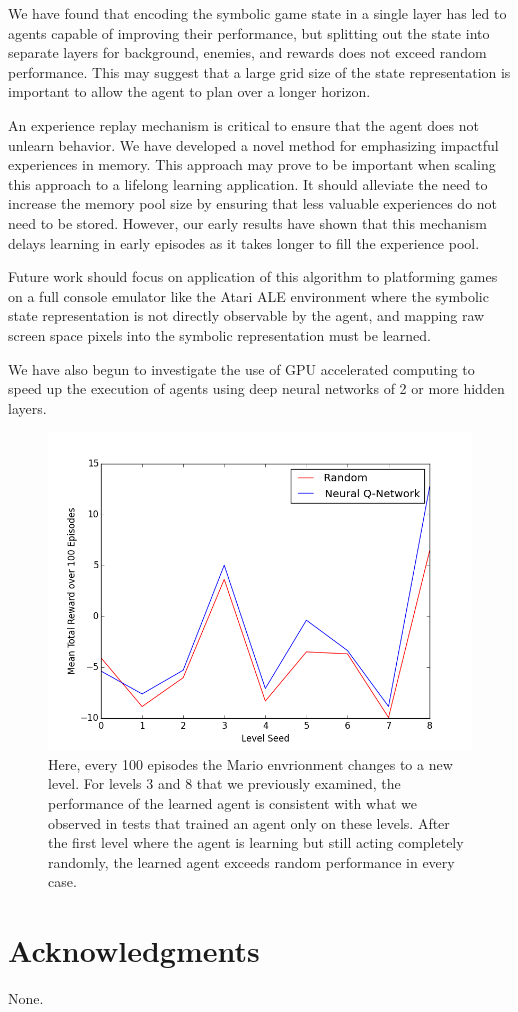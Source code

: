 \documentclass{article}
\begin{document}
We have found that encoding the symbolic game state in a single layer has led to agents capable of improving their performance, but splitting out the state into separate layers for background, enemies, and rewards does not exceed random performance. This may suggest that a large grid size of the state representation is important to allow the agent to plan over a longer horizon.
 
An experience replay mechanism is critical to ensure that the agent does not unlearn behavior. We have developed a novel method for emphasizing impactful experiences in memory. This approach may prove to be important when scaling this approach to a lifelong learning application. It should alleviate the need to increase the memory pool size by ensuring that less valuable experiences do not need to be stored. However, our early results have shown that this mechanism delays learning in early episodes as it takes longer to fill the experience pool.
 
Future work should focus on application of this algorithm to platforming games on a full console emulator like the Atari ALE environment where the symbolic state representation is not directly observable by the agent, and mapping raw screen space pixels into the symbolic representation must be learned. 

We have also begun to investigate the use of GPU accelerated computing to speed up the execution of agents using deep neural networks of 2 or more hidden layers.
 
 \begin{figure}
\begin{center}
\includegraphics[scale=0.42]{transfer_levels.png}
\caption{Here, every 100 episodes the Mario envrionment changes to a new level. For levels 3 and 8 that we previously examined, the performance of the learned agent is consistent with what we observed in tests that trained an agent only on these levels. After the first level where the agent is learning but still acting completely randomly, the learned agent exceeds random performance in every case.}
\end{center}
\end{figure}
 
\section*{Acknowledgments} 
 
None.



\end{document}
